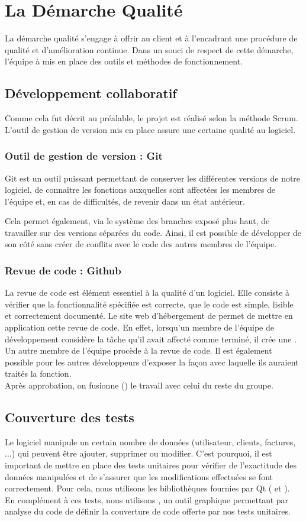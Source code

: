 \chapter{La Démarche Qualité}
La démarche qualité s'engage à offrir au client et à l'encadrant une procédure de qualité et d'amélioration continue. 
Dans un souci de respect de cette démarche, l'équipe à mis en place des outils et méthodes de fonctionnement. 
\section{Développement collaboratif}
Comme cela fut décrit au préalable, le projet est réalisé selon la méthode Scrum. L'outil de gestion de version  mis en place assure une certaine qualité au logiciel.
\subsection{Outil de gestion de version : Git}
Git est un outil puissant permettant de conserver les différentes versions de notre logiciel, de connaître les fonctions auxquelles sont affectées les membres de l'équipe et, en cas de difficultés, de revenir dans un état antérieur. 

Cela permet également, via le système des branches exposé plus haut, de travailler sur des versions séparées du code. Ainsi, il est possible de développer de son côté sans créer de conflits avec le code des autres membres de l'équipe. 
\subsection{Revue de code : Github}
La revue de code est élément essentiel à la qualité d'un logiciel. Elle consiste à vérifier que la fonctionnalité spécifiée est correcte, que le code est simple, lisible et correctement documenté. Le site web d'hébergement  de  permet de mettre en application cette revue de code. En effet, lorsqu'un membre de l'équipe de développement considère la tâche qu'il avait affecté comme terminé, il crée une . Un autre membre de l'équipe procède à la revue de code. Il est également possible pour les autres développeurs d'exposer la façon avec laquelle ils auraient traités la fonction. \\
Après approbation, on fusionne () le travail avec celui du reste du groupe. 
\section{Couverture des tests}
Le logiciel \FactDev manipule un certain nombre de données (utilisateur, clients, factures, ...) qui peuvent être ajouter, supprimer ou modifier. C'est pourquoi, il est important de mettre en place des tests unitaires pour vérifier de l'exactitude des données manipulées et de s'assurer que les modifications effectuées se font correctement. Pour cela, nous utilisons les bibliothèques fournies par Qt ( et ). \\
En complément à ces tests, nous utilisons , un outil graphique permettant par analyse du code de définir la couverture de code offerte par nos tests unitaires. 
